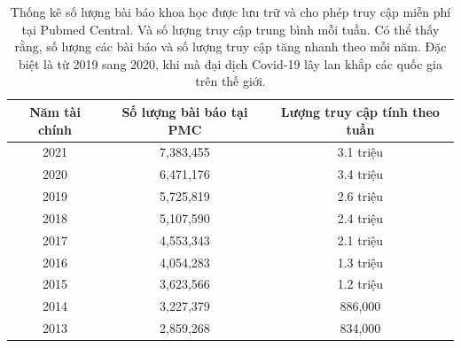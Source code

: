 \documentclass[../DoAn.tex]{subfiles}
\begin{document}
\begin{table}[]
\caption{Thống kê số lượng bài báo khoa học được lưu trữ và cho phép truy cập miễn phí tại Pubmed Central. Và số lượng truy cập trung bình mỗi tuần. Có thể thấy rằng, số lượng các bài báo và số lượng truy cập tăng nhanh theo mỗi năm. Đặc biệt là từ 2019 sang 2020, khi mà đại dịch Covid-19 lây lan khắp các quốc gia trên thế giới.}
\label{tab:statPMCrequest}
\begin{tabular}{@{}ccc@{}}
\toprule
\textbf{Năm tài chính} & \textbf{Số lượng bài báo tại PMC} & \textbf{Lượng truy cập tính theo tuần} \\ \midrule
2021 & 7,383,455 & 3.1 triệu \\
2020 & 6,471,176 & 3.4 triệu \\
2019 & 5,725,819 & 2.6 triệu \\
2018 & 5,107,590 & 2.4 triệu \\
2017 & 4,553,343 & 2.1 triệu \\
2016 & 4,054,283 & 1.3 triệu \\
2015 & 3,623,566 & 1.2 triệu \\
2014 & 3,227,379 & 886,000   \\
2013 & 2,859,268 & 834,000   \\ \bottomrule
\end{tabular}
\end{table}
\end{document}
